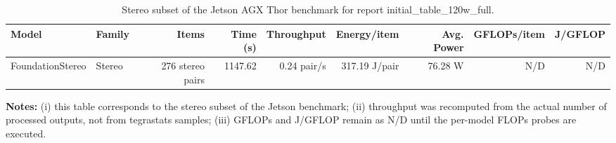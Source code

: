 \begin{table}[t]
\centering
\caption{Stereo subset of the Jetson AGX Thor benchmark for report initial_table_120w_full.}
\label{tab:initial_table_120w_full:stereo}
\begin{tabular}{l l r r r r r r r}
\hline
Model & Family & Items & Time (s) & Throughput & Energy/item & Avg. Power & GFLOPs/item & J/GFLOP \\
\hline
FoundationStereo & Stereo & 276 stereo pairs & 1147.62 & 0.24 pair/s & 317.19 J/pair & 76.28 W & N/D & N/D \\
\hline
\end{tabular}
\vspace{0.4em}

\parbox{0.96\linewidth}{\footnotesize
\textbf{Notes:}
(i) this table corresponds to the stereo subset of the Jetson benchmark;
(ii) throughput was recomputed from the actual number of processed outputs, not from tegrastats samples;
(iii) GFLOPs and J/GFLOP remain as N/D until the per-model FLOPs probes are executed.}
\end{table}
